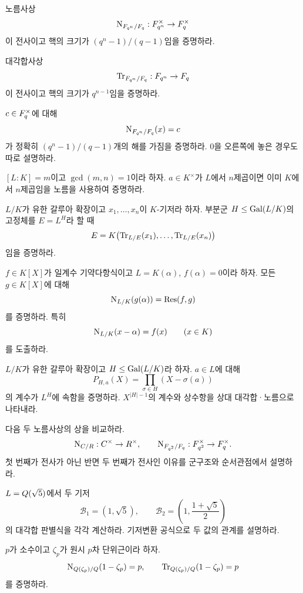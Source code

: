 \begin{exercise}[*]
노름사상
\[
  \operatorname{N}_{F_{q^n}/F_q}:F_{q^n}^\times\to F_q^\times
\]
이 전사이고 핵의 크기가 $(q^n-1)/(q-1)$임을 증명하라.
\end{exercise}

\begin{exercise}
대각합사상
\[
  \operatorname{Tr}_{F_{q^n}/F_q}:F_{q^n}\to F_q
\]
이 전사이고 핵의 크기가 $q^{n-1}$임을 증명하라.
\end{exercise}

\begin{exercise}
$c\in F_q^\times$에 대해
\[
  \operatorname{N}_{F_{q^n}/F_q}(x)=c
\]
가 정확히 $(q^n-1)/(q-1)$개의 해를 가짐을 증명하라.
$0$을 오른쪽에 놓은 경우도 따로 설명하라.
\end{exercise}

\begin{exercise}[*]
$[L:K]=m$이고 $\gcd(m,n)=1$이라 하자.
$a\in K^\times$가 $L$에서 $n$제곱이면 이미 $K$에서 $n$제곱임을
노름을 사용하여 증명하라.
\end{exercise}

\begin{exercise}
$L/K$가 유한 갈루아 확장이고 $x_1,\dots,x_n$이 $K$-기저라 하자.
부분군 $H\le\operatorname{Gal}(L/K)$의 고정체를 $E=L^H$라 할 때
\[
  E=K\bigl(
  \operatorname{Tr}_{L/E}(x_1),\dots,\operatorname{Tr}_{L/E}(x_n)
  \bigr)
\]
임을 증명하라.
\end{exercise}

\begin{exercise}[*]
$f\in K[X]$가 일계수 기약다항식이고 $L=K(\alpha)$,
$f(\alpha)=0$이라 하자. 모든 $g\in K[X]$에 대해
\[
  \operatorname{N}_{L/K}(g(\alpha))=\operatorname{Res}(f,g)
\]
를 증명하라. 특히
\[
  \operatorname{N}_{L/K}(x-\alpha)=f(x)
  \qquad(x\in K)
\]
를 도출하라.
\end{exercise}

\begin{exercise}
$L/K$가 유한 갈루아 확장이고 $H\le\operatorname{Gal}(L/K)$라 하자.
$a\in L$에 대해
\[
  P_{H,a}(X)=\prod_{\sigma\in H}(X-\sigma(a))
\]
의 계수가 $L^H$에 속함을 증명하라. $X^{|H|-1}$의 계수와 상수항을
상대 대각합·노름으로 나타내라.
\end{exercise}

\begin{exercise}
다음 두 노름사상의 상을 비교하라.
\[
  \operatorname{N}_{C/R}:C^\times\to R^\times,
  \qquad
  \operatorname{N}_{F_{q^2}/F_q}:F_{q^2}^\times\to F_q^\times.
\]
첫 번째가 전사가 아닌 반면 두 번째가 전사인 이유를 군구조와 순서관점에서 설명하라.
\end{exercise}

\begin{exercise}[*]
$L=Q(\sqrt5)$에서 두 기저
\[
  \mathcal B_1=(1,\sqrt5),
  \qquad
  \mathcal B_2=\left(1,\frac{1+\sqrt5}{2}\right)
\]
의 대각합 판별식을 각각 계산하라. 기저변환 공식으로 두 값의 관계를 설명하라.
\end{exercise}

\begin{exercise}[*]
$p$가 소수이고 $\zeta_p$가 원시 $p$차 단위근이라 하자.
\[
  \operatorname{N}_{Q(\zeta_p)/Q}(1-\zeta_p)=p,
  \qquad
  \operatorname{Tr}_{Q(\zeta_p)/Q}(1-\zeta_p)=p
\]
를 증명하라.
\end{exercise}
